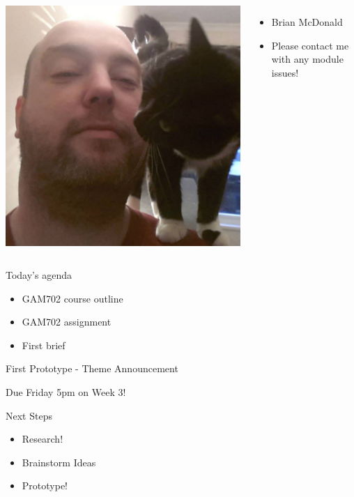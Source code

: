 \begin{frame}
	\begin{columns}
		\includegraphics[width=1.0\textwidth]{brian_mcdonald}
		\begin{itemize}
			\item Brian McDonald
			\item Please contact me with any module issues!
		\end{itemize}
	\end{columns}
\end{frame}

\begin{frame}{Today's agenda}
	\begin{itemize}
		\item GAM702 course outline
		\item GAM702 assignment
		\item First brief
	\end{itemize}
\end{frame}




\begin{frame}{First Prototype - Theme Announcement}
	\begin{center}
		\Huge{Due Friday 5pm on Week 3!}
	\end{center}
\end{frame}

\begin{frame}{Next Steps}
	\begin{itemize}
		\item Research!
		\item Brainstorm Ideas
		\item Prototype!
	\end{itemize}
\end{frame}

